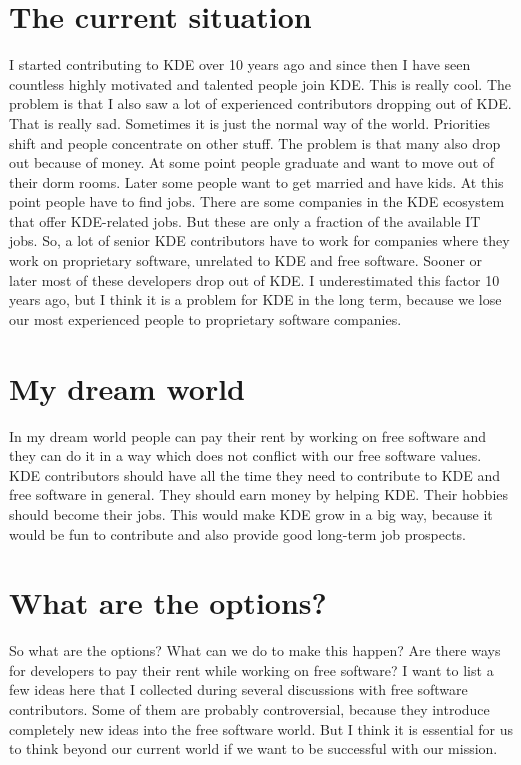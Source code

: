\section*{The current situation}

I started contributing to KDE over 10 years ago and since then I have seen
countless highly motivated and talented people join KDE. This is really cool.
The problem is that I also saw a lot of experienced contributors dropping out of
KDE. That is really sad. Sometimes it is just the normal way of the world.
Priorities shift and people concentrate on other stuff. The problem is that many
also drop out because of money. At some point people graduate and want to move
out of their dorm rooms. Later some people want to get married and have kids. At
this point people have to find jobs. There are some companies in the KDE
ecosystem that offer KDE-related jobs. But these are only a fraction of the
available IT jobs. So, a lot of senior KDE contributors have to work for
companies where they work on proprietary software, unrelated to KDE and free
software. Sooner or later most of these developers drop out of KDE.
I underestimated this factor 10 years ago, but I think it is a problem for KDE
in the long term, because we lose our most experienced people to proprietary
software companies.

\section*{My dream world}

In my dream world people can pay their rent by working on free software and
they can do it in a way which does not conflict with our free software values.
KDE contributors should have all the time they need to contribute to KDE and
free software in general. They should earn money by helping KDE. Their hobbies
should become their jobs. This would make KDE grow in a big way, because it
would be fun to contribute and also provide good long-term job prospects.  

\section*{What are the options?}

So what are the options? What can we do to make this happen? Are there ways for
developers to pay their rent while working on free software? I want to list a
few ideas here that I collected during several discussions with free software
contributors. Some of them are probably controversial, because they introduce
completely new ideas into the free software world. But I think it is essential
for us to think beyond our current world if we want to be successful with our
mission.  

